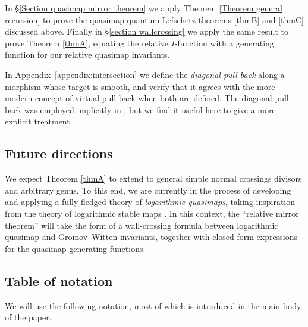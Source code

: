 \documentclass[10pt]{amsart}
\newcommand{\Q}[4]{\mathcal{Q}_{#1,#2}(#3,#4)}
\newcommand{\Gm}{\mathbb{G}_{\text{m}}}
\newcommand{\om}[1]{\mathcal{#1}}
\theoremstyle{definition}
\theoremstyle{definition}
\begin{document}
In \S \ref{Section quasimap mirror theorem} we apply Theorem \ref{Theorem general recursion} to prove the quasimap quantum Lefschetz theorems \ref{thmB} and \ref{thmC} discussed above. Finally in \S \ref{section wallcrossing} we apply the same result to prove Theorem \ref{thmA}, equating the relative $I$-function with a generating function for our relative quasimap invariants.

In Appendix~\ref{appendix:intersection} we define the \emph{diagonal pull-back} along a morphism whose target is smooth, and verify that it agrees with the more modern concept of virtual pull-back \cite{Manolache-Pull} when both are defined. The diagonal pull-back was employed implicitly in \cite{Ga}, but we find it useful here to give a more explicit treatment.

\subsection{Future directions}
We expect Theorem \ref{thmA} to extend to general simple normal crossings divisors and arbitrary genus. To this end, we are currently in the process of developing and applying a fully-fledged theory of \emph{logarithmic quasimaps}, taking inspiration from the theory of logarithmic stable maps \cite{GrossSiebertLog,ChenLog,AbramovichChenLog}. In this context, the ``relative mirror theorem'' will take the form of a wall-crossing formula between logarithmic quasimap and Gromov--Witten invariants, together with closed-form expressions for the quasimap generating functions.

\subsection{Table of notation} We will use the following notation, most of which is introduced in the main body of the paper.\medskip
\end{document}
